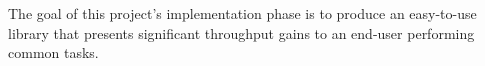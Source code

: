 The goal of this project's implementation phase is to produce an easy-to-use library that presents significant throughput gains to an end-user performing common tasks.









